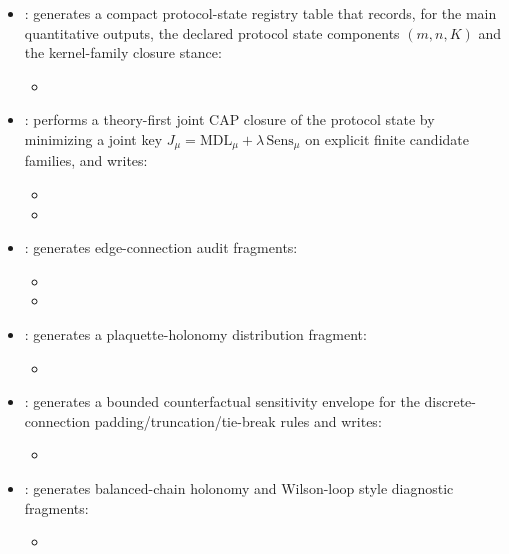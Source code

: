 \begin{sloppypar}
\begin{itemize}
\item {}: generates a compact protocol-state registry table that records, for the main quantitative outputs, the declared protocol state components $(m,n,K)$ and the kernel-family closure stance:
\begin{itemize}
\item {}
\end{itemize}
\item {}: performs a theory-first joint CAP closure of the protocol state by minimizing a joint key $J_\mu=\mathrm{MDL}_\mu+\lambda\,\mathrm{Sens}_\mu$ on explicit finite candidate families, and writes:
\begin{itemize}
\item {}
\item {}
\end{itemize}
\item {}: generates edge-connection audit fragments:
\begin{itemize}
\item {}
\item {}
\end{itemize}
\item {}: generates a plaquette-holonomy distribution fragment:
\begin{itemize}
\item {}
\end{itemize}
\item {}: generates a bounded counterfactual sensitivity envelope for the discrete-connection padding/truncation/tie-break rules and writes:
\begin{itemize}
\item {}
\end{itemize}
\item {}: generates balanced-chain holonomy and Wilson-loop style diagnostic fragments:
\begin{itemize}
\item {}

\end{itemize}
\end{itemize}
\end{sloppypar}
